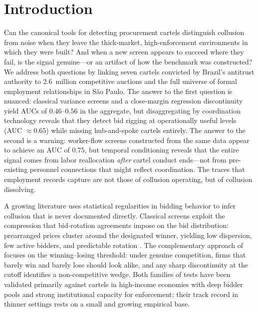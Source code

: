 \section{Introduction}\label{intro}

Can the canonical tools for detecting procurement cartels distinguish collusion from noise when they leave the thick-market, high-enforcement environments in which they were built? And when a new screen appears to succeed where they fail, is the signal genuine---or an artifact of how the benchmark was constructed? We address both questions by linking seven cartels convicted by Brazil's antitrust authority to 2.6~million competitive auctions and the full universe of formal employment relationships in S\~{a}o Paulo. The answer to the first question is nuanced: classical variance screens and a close-margin regression discontinuity yield AUCs of $0.46$--$0.56$ in the aggregate, but disaggregating by coordination technology reveals that they detect bid rigging at operationally useful levels (AUC $\approx 0.65$) while missing hub-and-spoke cartels entirely. The answer to the second is a warning: worker-flow screens constructed from the same data appear to achieve an AUC of $0.75$, but temporal conditioning reveals that the entire signal comes from labor reallocation \emph{after} cartel conduct ends---not from pre-existing personnel connections that might reflect coordination. The traces that employment records capture are not those of collusion operating, but of collusion dissolving.

A growing literature uses statistical regularities in bidding behavior to infer collusion that is never documented directly. Classical screens exploit the compression that bid-rotation agreements impose on the bid distribution: prearranged prices cluster around the designated winner, yielding low dispersion, few active bidders, and predictable rotation \citep{porter1993detecting, pesendorfer2000study, bajari2003detecting, conley2016detecting, imhof2018screening}. The complementary approach of \citet{kawai2023using} focuses on the winning--losing threshold: under genuine competition, firms that barely win and barely lose should look alike, and any sharp discontinuity at the cutoff identifies a non-competitive wedge. Both families of tests have been validated primarily against cartels in high-income economies with deep bidder pools and strong institutional capacity for enforcement; their track record in thinner settings rests on a small and growing empirical base.

